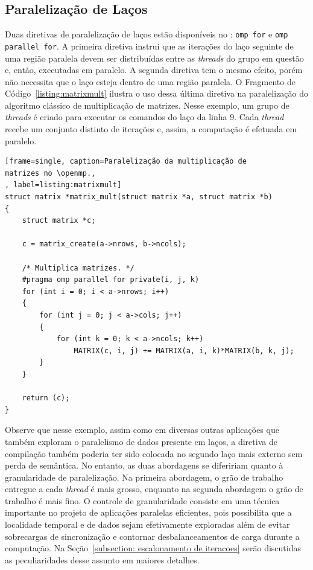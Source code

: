 \documentclass{SBCbookchapter}
\begin{document}
	\subsection{Paralelização de Laços}
	\label{subsection: paralelização de lacos}

		Duas diretivas de paralelização de laços estão disponíveis no
		\openmp: \texttt{omp for} e \texttt{omp parallel for}. A
		primeira diretiva instrui que as iterações do laço seguinte de
		uma região paralela devem ser distribuídas entre as
		\textit{threads} do grupo em questão e, então, executadas em
		paralelo. A segunda diretiva tem o mesmo efeito, porém não
		necessita que o laço esteja dentro de uma região paralela. O
		Fragmento de Código~\ref{listing:matrixmult} ilustra o uso dessa
		última diretiva na paralelização do algoritmo clássico de
		multiplicação de matrizes. Nesse exemplo, um grupo de
		\textit{threads} é criado para executar os comandos do laço da
		linha $9$. Cada \textit{thread} recebe um conjunto distinto de
		iterações e, assim, a computação é efetuada em paralelo. 

\begin{lstlisting}[frame=single, caption=Paralelização da multiplicação de
matrizes no \openmp.,
, label=listing:matrixmult]
struct matrix *matrix_mult(struct matrix *a, struct matrix *b)
{
	struct matrix *c;

	c = matrix_create(a->nrows, b->ncols);

	/* Multiplica matrizes. */
	#pragma omp parallel for private(i, j, k)
	for (int i = 0; i < a->nrows; i++)
	{
		for (int j = 0; j < a->cols; j++)
		{
			for (int k = 0; k < a->ncols; k++)
				MATRIX(c, i, j) += MATRIX(a, i, k)*MATRIX(b, k, j);
		}
	}

	return (c);
}
\end{lstlisting}

		Observe que nesse exemplo, assim como em diversas outras
		aplicações que também exploram o paralelismo de dados presente
		em laços, a diretiva de compilação também poderia ter sido
		colocada no segundo laço mais externo sem perda de semântica. No
		entanto, as duas abordagens se difeririam quanto à granularidade
		de paralelização. Na primeira abordagem, o grão de trabalho
		entregue a cada \textit{thread} é mais grosso, enquanto na
		segunda abordagem o grão de trabalho é mais fino. O controle de
		granularidade consiste em uma técnica importante no projeto de
		aplicações paralelas eficientes, pois possibilita que a
		localidade temporal e de dados sejam efetivamente exploradas
		além de evitar sobrecargas de sincronização e contornar
		desbalanceamentos de carga durante a computação. Na
		Seção~\ref{subsection: escalonamento de iteracoes} serão
		discutidas as peculiaridades desse assunto em maiores detalhes.
\end{document}
